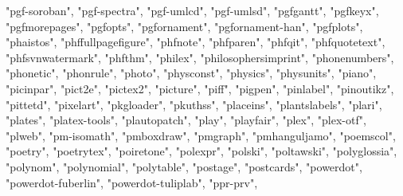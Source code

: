 \documentclass[
]{article}
\newenvironment{Shaded}{\begin{snugshade}}{\end{snugshade}}
\newcommand{\NormalTok}[1]{#1}
\newcommand{\StringTok}[1]{\textcolor[rgb]{0.31,0.60,0.02}{#1}}
\begin{document}
\begin{Shaded}
\begin{Highlighting}[]
\StringTok{"pgf{-}soroban"}\NormalTok{, }\StringTok{"pgf{-}spectra"}\NormalTok{, }\StringTok{"pgf{-}umlcd"}\NormalTok{, }\StringTok{"pgf{-}umlsd"}\NormalTok{, }\StringTok{"pgfgantt"}\NormalTok{, }
\StringTok{"pgfkeyx"}\NormalTok{, }\StringTok{"pgfmorepages"}\NormalTok{, }\StringTok{"pgfopts"}\NormalTok{, }\StringTok{"pgfornament"}\NormalTok{, }\StringTok{"pgfornament{-}han"}\NormalTok{, }
\StringTok{"pgfplots"}\NormalTok{, }\StringTok{"phaistos"}\NormalTok{, }\StringTok{"phffullpagefigure"}\NormalTok{, }\StringTok{"phfnote"}\NormalTok{, }\StringTok{"phfparen"}\NormalTok{, }
\StringTok{"phfqit"}\NormalTok{, }\StringTok{"phfquotetext"}\NormalTok{, }\StringTok{"phfsvnwatermark"}\NormalTok{, }\StringTok{"phfthm"}\NormalTok{, }\StringTok{"philex"}\NormalTok{, }
\StringTok{"philosophersimprint"}\NormalTok{, }\StringTok{"phonenumbers"}\NormalTok{, }\StringTok{"phonetic"}\NormalTok{, }\StringTok{"phonrule"}\NormalTok{, }
\StringTok{"photo"}\NormalTok{, }\StringTok{"physconst"}\NormalTok{, }\StringTok{"physics"}\NormalTok{, }\StringTok{"physunits"}\NormalTok{, }\StringTok{"piano"}\NormalTok{, }\StringTok{"picinpar"}\NormalTok{, }
\StringTok{"pict2e"}\NormalTok{, }\StringTok{"pictex2"}\NormalTok{, }\StringTok{"picture"}\NormalTok{, }\StringTok{"piff"}\NormalTok{, }\StringTok{"pigpen"}\NormalTok{, }\StringTok{"pinlabel"}\NormalTok{, }
\StringTok{"pinoutikz"}\NormalTok{, }\StringTok{"pittetd"}\NormalTok{, }\StringTok{"pixelart"}\NormalTok{, }\StringTok{"pkgloader"}\NormalTok{, }\StringTok{"pkuthss"}\NormalTok{, }\StringTok{"placeins"}\NormalTok{, }
\StringTok{"plantslabels"}\NormalTok{, }\StringTok{"plari"}\NormalTok{, }\StringTok{"plates"}\NormalTok{, }\StringTok{"platex{-}tools"}\NormalTok{, }\StringTok{"plautopatch"}\NormalTok{, }
\StringTok{"play"}\NormalTok{, }\StringTok{"playfair"}\NormalTok{, }\StringTok{"plex"}\NormalTok{, }\StringTok{"plex{-}otf"}\NormalTok{, }\StringTok{"plweb"}\NormalTok{, }\StringTok{"pm{-}isomath"}\NormalTok{, }
\StringTok{"pmboxdraw"}\NormalTok{, }\StringTok{"pmgraph"}\NormalTok{, }\StringTok{"pmhanguljamo"}\NormalTok{, }\StringTok{"poemscol"}\NormalTok{, }\StringTok{"poetry"}\NormalTok{, }
\StringTok{"poetrytex"}\NormalTok{, }\StringTok{"poiretone"}\NormalTok{, }\StringTok{"polexpr"}\NormalTok{, }\StringTok{"polski"}\NormalTok{, }\StringTok{"poltawski"}\NormalTok{, }\StringTok{"polyglossia"}\NormalTok{, }
\StringTok{"polynom"}\NormalTok{, }\StringTok{"polynomial"}\NormalTok{, }\StringTok{"polytable"}\NormalTok{, }\StringTok{"postage"}\NormalTok{, }\StringTok{"postcards"}\NormalTok{, }
\StringTok{"powerdot"}\NormalTok{, }\StringTok{"powerdot{-}fuberlin"}\NormalTok{, }\StringTok{"powerdot{-}tuliplab"}\NormalTok{, }\StringTok{"ppr{-}prv"}\NormalTok{, }

\end{Highlighting}
\end{Shaded}
\end{document}
